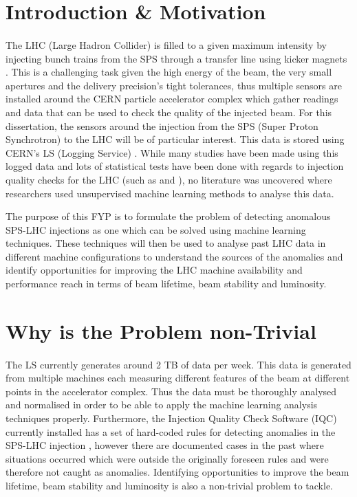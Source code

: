 \documentclass[12pt, twoside]{report}
\begin{document}
	\section{Introduction \& Motivation}	
	\paragraph{ }The LHC (Large Hadron Collider) is filled to a given maximum intensity by injecting bunch trains from the SPS through a transfer line using kicker magnets \cite{r:BeamQC}. This is a challenging task given the high energy of the beam, the very small apertures and the delivery precision's tight tolerances, thus multiple sensors are installed around the CERN particle accelerator complex \cite{r:Diagram} which gather readings and data that can be used to check the quality of the injected beam. For this dissertation, the sensors around the injection from the SPS (Super Proton Synchrotron) to the LHC will be of particular interest. This data is stored using CERN's LS (Logging Service) \cite{r:LS}. While many studies have been made using this logged data and lots of statistical tests have been done with regards to injection quality checks for the LHC (such as \cite{r:AutomaticIQCChecks} and \cite{r:BeamQC}), no literature was uncovered where researchers used unsupervised machine learning methods to analyse this data.
	\par The purpose of this FYP is to formulate the problem of detecting anomalous SPS-LHC injections as one which can be solved using machine learning techniques. These techniques will then be used to analyse past LHC data in different machine configurations to understand the sources of the anomalies and identify opportunities for improving the LHC machine availability and performance reach in terms of beam lifetime, beam stability and luminosity.
	
	\section{Why is the Problem non-Trivial}
	
	\paragraph{ }The LS currently generates around 2 TB of data per week. This data is generated from multiple machines each measuring different features of the beam at different points in the accelerator complex. Thus the data must be thoroughly analysed and normalised in order to be able to apply the machine learning analysis techniques properly. Furthermore, the Injection Quality Check Software (IQC) currently installed has a set of hard-coded rules for detecting anomalies in the SPS-LHC injection \cite{r:AutomaticIQCChecks}, however there are documented cases in the past where situations occurred which were outside the originally foreseen rules and were therefore not caught as anomalies. Identifying opportunities to improve the beam lifetime, beam stability and luminosity is also a non-trivial problem to tackle.
	
\end{document}
